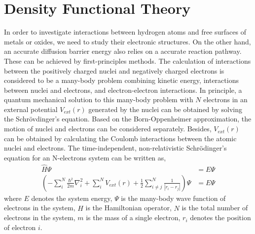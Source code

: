 \section{Density Functional Theory}
\label{Chap:Mech:DFT}

In order to investigate interactions between hydrogen atoms and free surfaces of metals or oxides, we need to study their electronic structures. On the other hand, an accurate diffusion barrier energy also relies on a accurate reaction pathway. These can be achieved by first-principles methods. The calculation of interactions between the positively charged nuclei and negatively charged electrons is considered to be a many-body problem combining kinetic energy, interactions between nuclei and electrons, and electron-electron interactions. In principle, a quantum mechanical solution to this many-body problem with $N$ electrons in an external potential $V_{ext}(r)$ generated by the nuclei can be obtained by solving the Schr\"{o}vdinger’s equation. Based on the Born-Oppenheimer approximation, the motion of nuclei and electrons can be considered separately. Besides, $V_{ext}(r)$ can be obtained by calculating the Coulomb interactions between the atomic nuclei and electrons. The time-independent, non-relativistic Schr\"{o}dinger's equation for an N-electrons system can be written as,
\begin{subequations}
\begin{align}
\hat{H}\Psi & = E\Psi \label{Chap:Meth:DFT:eq:shdr1} \\
(-\sum_i^N \frac{\hbar^2}{2m}\nabla_i^2 + \sum_i^N V_{ext}(r) + \frac{1}{2}\sum_{i \neq j}^N\frac{1}{|r_i - r_j|}) \Psi & = E \Psi \label{Chap:Meth:DFT:eq:shdr2}
\end{align}
\end{subequations}
where $E$ denotes the system energy, $\Psi$ is the many-body wave function of electrons in the system, $\hat{H}$ is the Hamiltonian operator, $N$ is the total number of electrons in the system, $m$ is the mass of a single electron, $r_i$ denotes the position of electron $i$.


